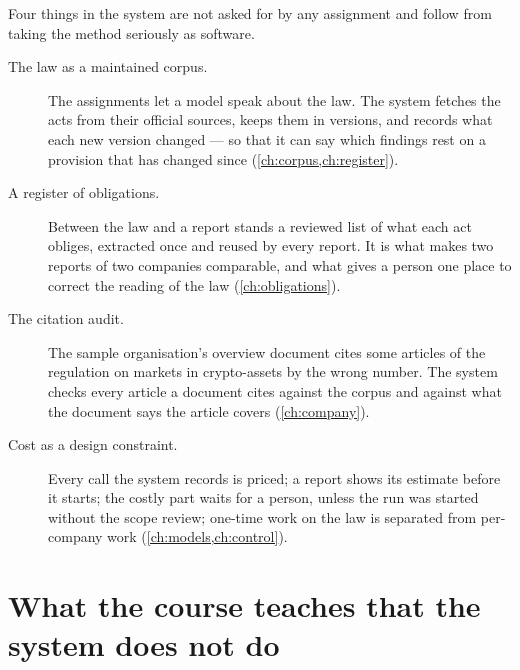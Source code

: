 Four things in the system are not asked for by any assignment and follow from taking the
method seriously as software.

\begin{description}
  \item[The law as a maintained corpus.] The assignments let a model speak about the law. The
    system fetches the acts from their official sources, keeps them in versions, and records
    what each new version changed --- so that it can say which findings rest on a provision
    that has changed since (\cref{ch:corpus,ch:register}).
  \item[A register of obligations.] Between the law and a report stands a reviewed list of
    what each act obliges, extracted once and reused by every report. It is what makes two
    reports of two companies comparable, and what gives a person one place to correct the
    reading of the law (\cref{ch:obligations}).
  \item[The citation audit.] The sample organisation's overview document cites some articles
    of the regulation on markets in crypto-assets by the wrong number. The system checks every
    article a document cites against the corpus and against what the document says the
    article covers (\cref{ch:company}).
  \item[Cost as a design constraint.] Every call the system records is priced; a report shows its estimate before
    it starts; the costly part waits for a person, unless the run was started without the
    scope review; one-time work on the law is separated from
    per-company work (\cref{ch:models,ch:control}).
\end{description}

\section{What the course teaches that the system does not do}\label{sec:course:not}

